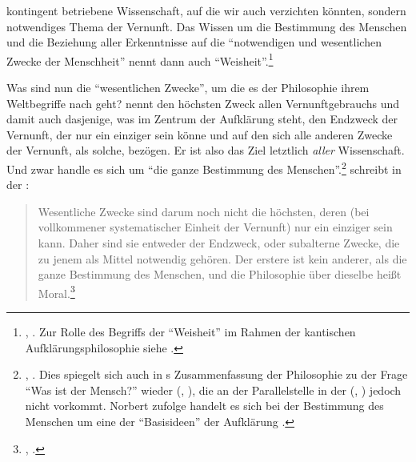 kontingent betriebene Wissenschaft, auf die wir auch verzichten könnten, sondern
notwendiges Thema der Vernunft. Das Wissen um die Bestimmung des Menschen und
die Beziehung aller Erkenntnisse auf die \enquote{notwendigen und wesentlichen
Zwecke der Menschheit} nennt  dann auch
\enquote{Weisheit}.\footnote{\cite[][B~878]{Kant:KritikderreinenVernunft2003},
\cite[][III: 549.13--24]{Kant:GesammelteWerke1900ff.}. Zur Rolle des Begriffs
der \enquote{Weisheit} im Rahmen der kantischen Aufklärungsphilosophie
siehe \cite{Trawny:DasIdealdesWeisen2008}.}

Was sind nun die \enquote{wesentlichen Zwecke}, um die es der Philosophie ihrem
Weltbegriffe nach geht?  nennt den höchsten Zweck allen
Vernunftgebrauchs und damit auch dasjenige, was im Zentrum der Aufklärung steht, den Endzweck der Vernunft, der
nur ein einziger sein könne und auf den sich alle anderen Zwecke der Vernunft,
als solche, bezögen. Er ist also das Ziel letztlich \emph{aller} Wissenschaft. Und zwar
handle es sich um \enquote{die ganze Bestimmung des
Menschen}.\footnote{\cite[][B~868]{Kant:KritikderreinenVernunft2003}, \cite[][III:
543.11]{Kant:GesammelteWerke1900ff.}.
Dies spiegelt sich auch in s Zusammenfassung der
Philosophie zu der Frage \enquote{Was ist der Mensch?} wieder
\mkbibparens{\cite[vgl.][A 25]{Kant:ImmanuelKantsLogik1977}, \cite[][IX:
25.3--6]{Kant:GesammelteWerke1900ff.}}, die an der Parallelstelle in der
\mkbibparens{\cite[vgl.][B 833]{Kant:KritikderreinenVernunft2003},
\cite[][III: 522.32--34]{Kant:GesammelteWerke1900ff.}} jedoch nicht vorkommt.
Norbert  zufolge handelt es sich bei der Bestimmung des Menschen
um eine der \enquote{Basisideen} der Aufklärung
\parencite[vgl.][398]{Hinske:ArtikelAufklaerung1985}.}
 schreibt in der :
\begin{quote}\label{Zitat:EndzweckalsganzeBestimmungdesMenschen}
  Wesentliche Zwecke sind darum noch nicht die höchsten, deren (bei
  vollkommener systematischer Einheit der Vernunft) nur ein einziger sein kann.
  Daher sind sie entweder der Endzweck, oder subalterne Zwecke, die zu jenem als
  Mittel notwendig gehören. Der erstere ist kein anderer, als die ganze
  Bestimmung des Menschen, und die Philosophie über dieselbe heißt
  Moral.\footnote{\label{Anmerkung:GanzeBestimmung}\cite[B~868]{Kant:KritikderreinenVernunft2003},
  \cite[III: 543.7--12]{Kant:GesammelteWerke1900ff.}.}
\end{quote}
